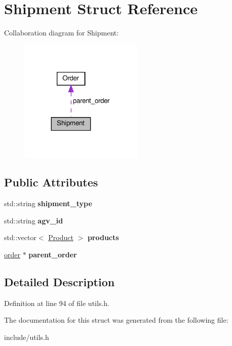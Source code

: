 \hypertarget{structShipment}{}\section{Shipment Struct Reference}
\label{structShipment}


Collaboration diagram for Shipment\+:
\nopagebreak
\begin{figure}[H]
\begin{center}
\leavevmode
\includegraphics[width=167pt]{structShipment__coll__graph}
\end{center}
\end{figure}
\subsection*{Public Attributes}
\begin{DoxyCompactItemize}
\item 
\mbox{\label{structShipment_afee83324bb0718df0bad07ddd6bfa698}} 
std\+::string {\bfseries shipment\+\_\+type}
\item 
\mbox{\label{structShipment_a99c0e2efeb36ae051bebfee925076af1}} 
std\+::string {\bfseries agv\+\_\+id}
\item 
\mbox{\label{structShipment_a549d2e4b2e90019d18e55110593e790f}} 
std\+::vector$<$ \hyperlink{structProduct}{Product} $>$ {\bfseries products}
\item 
\mbox{\label{structShipment_a1f5c06a24c0915d76b7bea80f3bd8d31}} 
\hyperlink{structOrder}{order} $\ast$ {\bfseries parent\+\_\+order}
\end{DoxyCompactItemize}


\subsection{Detailed Description}


Definition at line 94 of file utils.\+h.



The documentation for this struct was generated from the following file\+:\begin{DoxyCompactItemize}
\item 
include/utils.\+h\end{DoxyCompactItemize}
